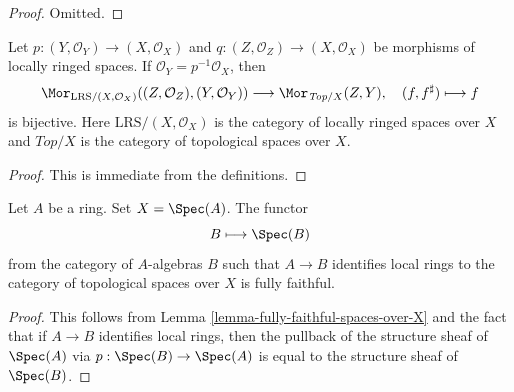 \begin{proof}
Omitted.
\end{proof}

\begin{lemma}
\label{lemma-fully-faithful-spaces-over-X}
Let $p : (Y, \mathcal{O}_Y) \to (X, \mathcal{O}_X)$ and
$q : (Z, \mathcal{O}_Z) \to (X, \mathcal{O}_X)$
be morphisms of locally ringed spaces.
If $\mathcal{O}_Y = p^{-1}\mathcal{O}_X$, then
$$
\Mor_{\text{LRS}/(X, \mathcal{O}_X)}((Z, \mathcal{O}_Z), (Y, \mathcal{O}_Y))
\longrightarrow
\Mor_{\textit{Top}/X}(Z, Y),\quad
(f, f^\sharp) \longmapsto f
$$
is bijective. Here $\text{LRS}/(X, \mathcal{O}_X)$ is the category of
locally ringed spaces over $X$ and $\textit{Top}/X$ is the category
of topological spaces over $X$.
\end{lemma}

\begin{proof}
This is immediate from the definitions.
\end{proof}

\begin{lemma}
\label{lemma-local-isomorphism-fully-faithful}
Let $A$ be a ring. Set $X = \Spec(A)$. The functor
$$
B \longmapsto \Spec(B)
$$
from the category of $A$-algebras $B$ such that $A \to B$ identifies
local rings to the category of
topological spaces over $X$ is fully faithful.
\end{lemma}

\begin{proof}
This follows from Lemma \ref{lemma-fully-faithful-spaces-over-X}
and the fact that if $A \to B$ identifies local rings, then the pullback
of the structure sheaf of $\Spec(A)$ via $p : \Spec(B) \to \Spec(A)$
is equal to the structure sheaf of $\Spec(B)$.
\end{proof}
